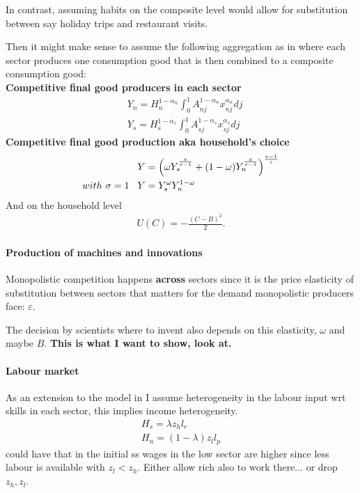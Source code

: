 In contrast, assuming habits on the composite level would allow for substitution between say holiday trips and restaurant visits.

Then it might make sense to assume the following aggregation as in \cite{Acemoglu2012TheChange} where each sector produces one  consumption good that is then combined to a composite consumption good: \\

\noindent\textbf{Competitive final good producers in each sector}
\begin{align*}
&Y_n= H_n^{1-\alpha_n}\int_{0}^{1}A_{nj}^{1-\alpha_n}x_{nj}^{\alpha_n} dj\\
&Y_s= H_s^{1-\alpha_s}\int_{0}^{1}A_{sj}^{1-\alpha_s}x_{sj}^{\alpha_s} dj
\end{align*}
\textbf{Competitive final good production aka household's choice}
\begin{align*}
&Y=\left(\omega Y_s^{\frac{\varepsilon}{\varepsilon-1}}+(1-\omega)Y_n^{\frac{\varepsilon}{\varepsilon-1}}\right)^{\frac{\varepsilon-1}{\varepsilon}}\\
with \ \sigma=1 \hspace{3mm} & Y=Y_s^\omega Y_n^{1-\omega}
\end{align*}
And on the household level
\begin{align*}
U(C)=-\frac{(C-B)^2}{2}.
\end{align*}

\paragraph{Production of machines and innovations \citep{Acemoglu2012TheChange}}
Monopolistic competition happens \textbf{across} sectors since it is the price elasticity of substitution between sectors that matters for the demand monopolistic producers face: $\varepsilon$.

The decision by scientists where to invent also depends on this elasticity, $\omega$ and maybe $B$. \textbf{This is what I want to show, look at.}

\paragraph{Labour market}
As an extension to the model in \cite{Acemoglu2012TheChange} I assume heterogeneity in the labour input wrt skills in each sector, this implies income heterogeneity. 
\begin{align*}
H_s= \lambda z_h l_r\\
H_n= (1-\lambda) z_l l_p
\end{align*}
\ar could have that in the initial ss wages in the low sector are higher since less labour is available with $z_l<z_h$. Either allow rich also to work there... or drop $z_h, z_l$. 

